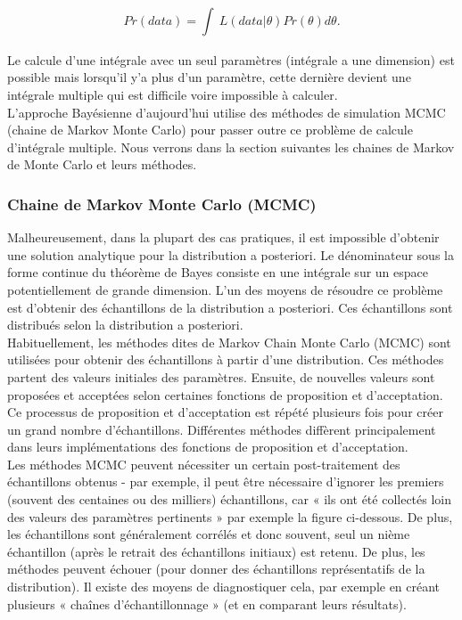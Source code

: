 \begin{equation}
	Pr(data) = \int_{}^{}  \,L(data|\theta)Pr(\theta)d\theta .
	\label{probability_of_data}
\end{equation}

Le calcule d’une intégrale avec un seul paramètres (intégrale a une dimension) est possible mais lorsqu’il y’a plus d’un paramètre, cette dernière devient une intégrale multiple qui est difficile voire impossible à calculer. \\
L’approche Bayésienne d’aujourd’hui utilise des méthodes de simulation MCMC (chaine de Markov Monte Carlo) pour passer outre ce problème de calcule d’intégrale multiple. Nous verrons dans la section suivantes les chaines de Markov de Monte Carlo et leurs méthodes.

\subsubsection{Chaine de Markov Monte Carlo (MCMC)}
Malheureusement, dans la plupart des cas pratiques, il est impossible d'obtenir une solution analytique pour la distribution a posteriori. Le dénominateur sous la forme continue du théorème de Bayes consiste en une intégrale sur un espace potentiellement de grande dimension. L'un des moyens de résoudre ce problème est d'obtenir des échantillons de la distribution a posteriori. Ces échantillons sont distribués selon la distribution a posteriori.  \\
Habituellement, les méthodes dites de Markov Chain Monte Carlo (MCMC) sont utilisées pour obtenir des échantillons à partir d'une distribution. Ces méthodes partent des valeurs initiales des paramètres. Ensuite, de nouvelles valeurs sont proposées et acceptées selon certaines fonctions de proposition et d'acceptation. Ce processus de proposition et d'acceptation est répété plusieurs fois pour créer un grand nombre d'échantillons. Différentes méthodes diffèrent principalement dans leurs implémentations des fonctions de proposition et d'acceptation. \\
Les méthodes MCMC peuvent nécessiter un certain post-traitement des échantillons obtenus - par exemple, il peut être nécessaire d'ignorer les premiers (souvent des centaines ou des milliers) échantillons, car « ils ont été collectés loin des valeurs des paramètres pertinents » par exemple la figure ci-dessous. De plus, les échantillons sont généralement corrélés et donc souvent, seul un nième échantillon (après le retrait des échantillons initiaux) est retenu. De plus, les méthodes peuvent échouer (pour donner des échantillons représentatifs de la distribution). Il existe des moyens de diagnostiquer cela, par exemple en créant plusieurs « chaînes d'échantillonnage » (et en comparant leurs résultats). \\


